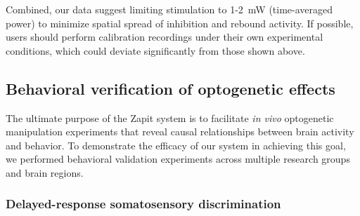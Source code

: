Combined, our data suggest limiting stimulation to 1-2~mW (time-averaged power) to minimize spatial spread of inhibition and rebound activity.
If possible, users should perform calibration recordings under their own experimental conditions, which could deviate significantly from those shown above.

\subsection{Behavioral verification of optogenetic effects}

The ultimate purpose of the Zapit system is to facilitate \textit{in vivo} optogenetic manipulation experiments that reveal causal relationships between brain activity and behavior.
To demonstrate the efficacy of our system in achieving this goal, we performed behavioral validation experiments across multiple research groups and brain regions.

\subsubsection{Delayed-response somatosensory discrimination}

